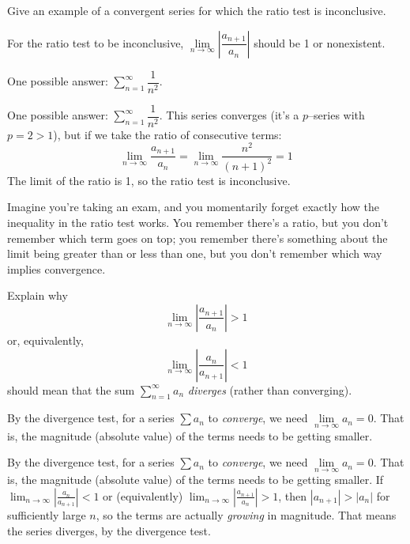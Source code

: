\begin{Mquestion}
Give an example of a convergent series for which the ratio test is inconclusive.
\end{Mquestion}
\begin{hint}
For the ratio test to be inconclusive, $\lim\limits_{n \to \infty}\left|\dfrac{a_{n+1}}{a_n}\right|$ should be 1 or nonexistent.
\end{hint}
\begin{answer}
One possible answer: $\displaystyle\sum_{n=1}^\infty \dfrac{1}{n^2}$.
\end{answer}
\begin{solution}
One possible answer: $\displaystyle\sum_{n=1}^\infty \dfrac{1}{n^2}$. This series converges (it's a $p$--series with $p=2>1$), but if we take the ratio of consecutive terms:
\[\lim_{n \to \infty}\frac{a_{n+1}}{a_n} = \lim_{n \to \infty}\frac{n^2}{(n+1)^2}=1\]
The limit of the ratio is 1, so the ratio test is inconclusive.
\end{solution}
\begin{question}
Imagine you're taking an exam, and you momentarily forget exactly how the inequality in the ratio test works. You remember there's a ratio, but you don't remember which term goes on top; you remember there's something about the limit being greater than or less than one, but you don't remember which way implies convergence.

 Explain why
\[\lim_{n \to \infty}\left|\frac{a_{n+1}}{a_{n}}\right|>1\]
or, equivalently,
\[\lim_{n \to \infty}\left|\frac{a_n}{a_{n+1}}\right|<1\]
should mean that the sum $\sum\limits_{n=1}^\infty a_n$ \emph{diverges} (rather than converging).
\end{question}
\begin{hint}
By the divergence test, for a series $\sum a_n$ to \emph{converge}, we need $\lim\limits_{n \to \infty} a_n=0$. That is, the magnitude (absolute value) of the terms needs to be getting smaller.
\end{hint}
\begin{answer}
By the divergence test, for a series $\sum a_n$ to \emph{converge}, we need $\lim\limits_{n \to \infty} a_n=0$. That is, the magnitude (absolute value) of the terms needs to be getting smaller. If $\displaystyle\lim_{n \to \infty}\left|\frac{a_n}{a_{n+1}}\right|<1$ or (equivalently) $\displaystyle \lim_{n \to \infty}\left|\frac{a_{n+1}}{a_{n}}\right|>1$, then $|a_{n+1}|>|a_n|$ for sufficiently large $n$, so the terms are actually \emph{growing} in magnitude. That means the series diverges, by the divergence test.
\end{answer}
